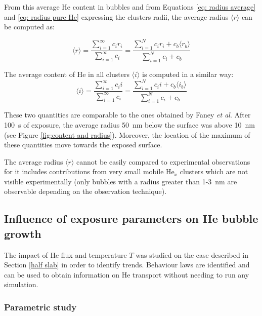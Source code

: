 From this average He content in bubbles and from Equations \ref{eq: radius average} and \ref{eq: radius pure He} expressing the clusters radii, the average radius $\langle r \rangle$ can be computed as:

\begin{equation}
        \langle r \rangle = \frac{\sum\limits_{i=1}^\infty c_i r_i}{\sum\limits_{i=1}^\infty c_i}
        = \frac{\sum\limits_{i=1}^N c_i r_i + c_b \langle r_b \rangle }{\sum\limits_{i=1}^N c_i + c_b}
\end{equation}

The average content of He in all clusters $\langle i \rangle$ is computed in a similar way:
\begin{equation}
        \langle i \rangle = \frac{\sum\limits_{i=1}^\infty c_i i}{\sum\limits_{i=1}^\infty c_i}
        = \frac{\sum\limits_{i=1}^N c_i i + c_b \langle i_b \rangle }{\sum\limits_{i=1}^N c_i + c_b}
\end{equation}

These two quantities are comparable to the ones obtained by Faney \textit{et al}.
After \SI{100}{s} of exposure, the average radius \SI{50}{nm} below the surface was above \SI{10}{nm} (see Figure \ref{fig:content and radius}).
Moreover, the location of the maximum of these quantities move towards the exposed surface.

The average radius $\langle r \rangle$ cannot be easily compared to experimental observations for it includes contributions from very small mobile He$_x$ clusters which are not visible experimentally (only bubbles with a radius greater than 1-\SI{3}{nm} are observable depending on the observation technique).

\subsection{Influence of exposure parameters on He bubble growth}
The impact of He flux and temperature $T$ was studied on the case described in Section \ref{half slab} in order to identify trends.
Behaviour laws are identified and can be used to obtain information on He transport without needing to run any simulation.

\subsubsection{Parametric study} \label{parametric study}

